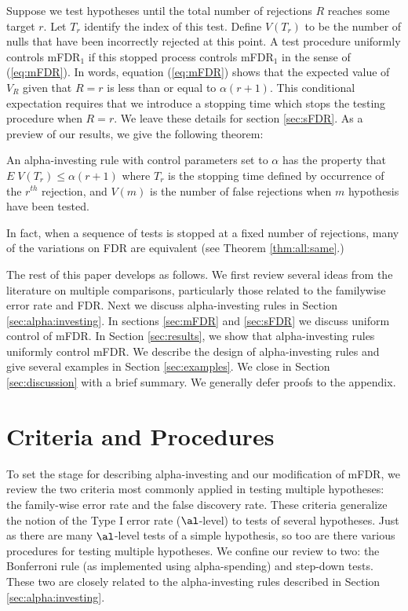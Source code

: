 \documentclass[12pt]{article}
\begin{document}
Suppose we test hypotheses until the total number of rejections $R$
reaches some target $r$.  Let $T_{r}$ identify the index of this test.
Define $V(T_{r})$ to be the number of nulls that have been incorrectly
rejected at this point. A test procedure uniformly controls
mFDR${}_{1}$ if this stopped process controls mFDR${}_{1}$ in the
sense of (\ref{eq:mFDR}). In words, equation (\ref{eq:mFDR}) shows
that the expected value of $V_R$ given that $R=r$ is less than or
equal to $\alpha(r+1)$.  This conditional expectation requires that we
introduce a stopping time which stops the testing procedure when
$R=r$.  We leave these details for section \ref{sec:sFDR}.  As a
preview of our results, we give the following theorem:
\begin{theorem}\label{thm:stopped}
An alpha-investing rule with control parameters set to $\alpha$ has
 the property that $E \; V(T_{r}) \le \alpha(r+1)$ where $T_{r}$ is
 the stopping time defined by occurrence of the $r^{th}$ rejection, and
 $V(m)$ is the number of false rejections when $m$ hypothesis have
 been tested.
\end{theorem}
In fact, when a sequence of tests is stopped at a fixed number of rejections,
 many of the variations on FDR are equivalent (see Theorem
 \ref{thm:all:same}.)

The rest of this paper develops as follows.  We first review several
 ideas from the literature on multiple comparisons, particularly those
 related to the familywise error rate and FDR.  Next we discuss
 alpha-investing rules in Section \ref{sec:alpha:investing}.  In
 sections \ref{sec:mFDR} and \ref{sec:sFDR} we discuss uniform control
 of mFDR.  In Section \ref{sec:results}, we show that alpha-investing
 rules uniformly control mFDR.  We describe the design of
 alpha-investing rules and give several examples in Section
 \ref{sec:examples}.  We close in Section \ref{sec:discussion} with a
 brief summary.  We generally defer proofs to the appendix.


\section{Criteria and Procedures }  \label{sec:procedure} %

To set the stage for describing alpha-investing and our modification
of mFDR, we review the two criteria most commonly applied in testing
multiple hypotheses: the family-wise error rate and the false
discovery rate.  These criteria generalize the notion of the Type I
error rate ($\al$-level) to tests of several hypotheses.  Just as
there are many $\al$-level tests of a simple hypothesis, so too are
there various procedures for testing multiple hypotheses.  We confine
our review to two: the Bonferroni rule (as implemented using
alpha-spending) and step-down tests.  These two are closely related to
the alpha-investing rules described in Section
\ref{sec:alpha:investing}.
\end{document}
